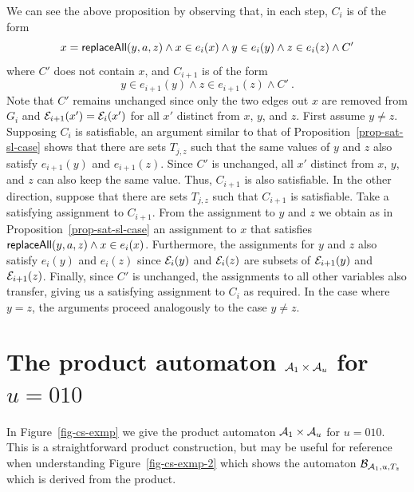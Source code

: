 We can see the above proposition by observing that, in each step, $C_i$ is of the form
\[
    x = \mathsf{replaceAll}(y, a, z) \wedge x \in e_i(x) \wedge y \in e_i(y) \wedge z \in e_i(z) \wedge C'
\]
where $C'$ does not contain $x$, and $C_{i+1}$ is of the form
\[
    y \in e_{i+1}(y) \wedge z \in e_{i+1}(z) \wedge C' \ .
\]
Note that $C'$ remains unchanged since only the two edges out $x$ are removed from $G_i$ and $\mathcal{E}_{i+1}(x') = \mathcal{E}_i(x')$ for all $x'$ distinct from $x$, $y$, and $z$.
First assume $y \neq z$.
Supposing $C_i$ is satisfiable, an argument similar to that of Proposition~\ref{prop-sat-sl-case} shows that there are sets $T_{j,z}$ such that the same values of $y$ and $z$ also satisfy $e_{i+1}(y)$ and $e_{i+1}(z)$.
Since $C'$ is unchanged, all $x'$ distinct from $x$, $y$, and $z$ can also keep the same value.
Thus, $C_{i+1}$ is also satisfiable.
In the other direction, suppose that there are sets $T_{j, z}$ such that $C_{i+1}$ is satisfiable. Take a satisfying assignment to $C_{i+1}$.
From the assignment to $y$ and $z$ we obtain as in Proposition~\ref{prop-sat-sl-case} an assignment to $x$ that satisfies $\mathsf{replaceAll}(y, a, z) \wedge x \in e_i(x)$.
Furthermore, the assignments for $y$ and $z$ also satisfy $e_i(y)$ and $e_i(z)$ since $\mathcal{E}_i(y)$ and $\mathcal{E}_i(z)$ are subsets of $\mathcal{E}_{i+1}(y)$ and $\mathcal{E}_{i+1}(z)$.
Finally, since $C'$ is unchanged, the assignments to all other variables also transfer, giving us a satisfying assignment to $C_i$ as required.
In the case where $y = z$, the arguments proceed analogously to the case $y \neq z$.


\section{The product automaton $\mathcal{A}_1 \times \mathcal{A}_u$ for $u = 010$}

In Figure~\ref{fig-cs-exmp} we give the product automaton $\mathcal{A}_1 \times \mathcal{A}_u$ for $u = 010$.
This is a straightforward product construction, but may be useful for reference when understanding Figure~\ref{fig-cs-exmp-2} which shows the automaton $\mathcal{B}_{\mathcal{A}_1, u, T_z}$ which is derived from the product.

